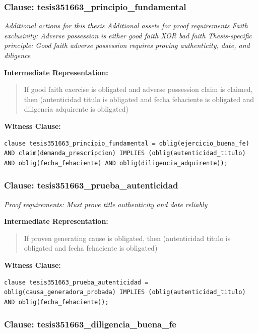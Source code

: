 \documentclass[11pt,a4paper]{article}
\begin{document}
\subsubsection{Clause: tesis351663\_principio\_fundamental}

\textit{Additional actions for this thesis Additional assets for proof requirements Faith exclusivity: Adverse possession is either good faith XOR bad faith Thesis-specific principle: Good faith adverse possession requires proving authenticity, date, and diligence}

\textbf{Intermediate Representation:}

\begin{quote}
If good faith exercise is obligated and adverse possession claim is claimed, then (autenticidad titulo is obligated and fecha fehaciente is obligated and diligencia adquirente is obligated)
\end{quote}

\textbf{Witness Clause:}

\begin{lstlisting}[style=witnessstyle, language=Witness]
clause tesis351663_principio_fundamental = oblig(ejercicio_buena_fe) AND claim(demanda_prescripcion) IMPLIES (oblig(autenticidad_titulo) AND oblig(fecha_fehaciente) AND oblig(diligencia_adquirente));
\end{lstlisting}

\subsubsection{Clause: tesis351663\_prueba\_autenticidad}

\textit{Proof requirements: Must prove title authenticity and date reliably}

\textbf{Intermediate Representation:}

\begin{quote}
If proven generating cause is obligated, then (autenticidad titulo is obligated and fecha fehaciente is obligated)
\end{quote}

\textbf{Witness Clause:}

\begin{lstlisting}[style=witnessstyle, language=Witness]
clause tesis351663_prueba_autenticidad = oblig(causa_generadora_probada) IMPLIES (oblig(autenticidad_titulo) AND oblig(fecha_fehaciente));
\end{lstlisting}

\subsubsection{Clause: tesis351663\_diligencia\_buena\_fe}
\end{document}
